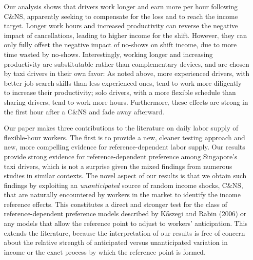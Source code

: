 \documentclass[reviewmode]{restud}
\begin{document}
Our analysis shows that drivers work longer and earn more per hour following C\&NS, apparently seeking to compensate for the loss and to reach the income target. Longer work hours and increased productivity can reverse the negative impact of cancellations, leading to higher income for the shift. However, they can only fully offset the negative impact of no-shows on shift income, due to more time wasted by no-shows. Interestingly, working longer and increasing productivity are substitutable rather than complementary devices, and are chosen by taxi drivers in their own favor: As noted above, more experienced drivers, with better job search skills than less experienced ones, tend to work more diligently to increase their productivity; solo drivers, with a more flexible schedule than sharing drivers, tend to work more hours. Furthermore, these effects are strong in the first hour after a C\&NS and fade away afterward. 

Our paper makes three contributions to the literature on daily labor supply of flexible-hour workers. The first is to provide a new, cleaner testing approach and new, more compelling evidence for reference-dependent labor supply. Our results provide strong evidence for reference-dependent preference among Singapore's taxi drivers, which is not a surprise given the mixed findings from numerous studies in similar contexts. The novel aspect of our results is that we obtain such findings by exploiting an \textit{unanticipated} source of random income shocks, C\&NS, that are naturally encountered by workers in the market to identify the income reference effects. This constitutes a direct and stronger test for the class of reference-dependent preference models described by Kőszegi and Rabin (2006) or any models that allow the reference point to adjust to workers' anticipation. This extends the literature, because the interpretation of our results is free of concern about the relative strength of anticipated versus unanticipated variation in income or the exact process by which the reference point is formed.
\end{document}
